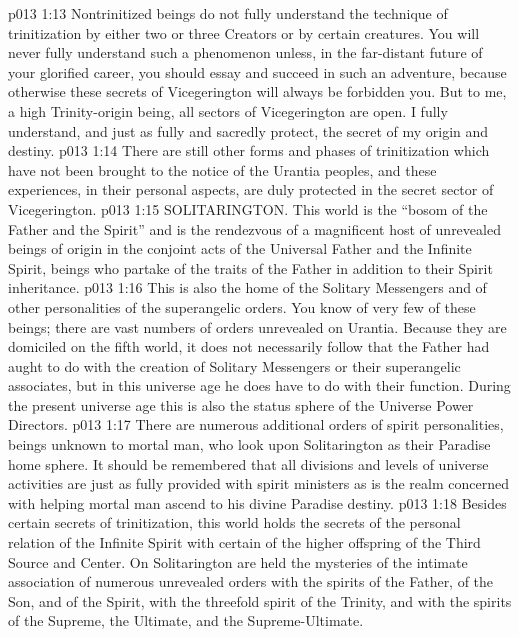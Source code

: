 \vs p013 1:13 Nontrinitized beings do not fully understand the technique of trinitization by either two or three Creators or by certain creatures. You will never fully understand such a phenomenon unless, in the far\hyp{}distant future of your glorified career, you should essay and succeed in such an adventure, because otherwise these secrets of Vicegerington will always be forbidden you. But to me, a high Trinity\hyp{}origin being, all sectors of Vicegerington are open. I fully understand, and just as fully and sacredly protect, the secret of my origin and destiny.\plusone
\vs p013 1:14 There are still other forms and phases of trinitization which have not been brought to the notice of the Urantia peoples, and these experiences, in their personal aspects, are duly protected in the secret sector of Vicegerington.
\pc \vs p013 1:15 \bibnobreakspace SOLITARINGTON. This world is the “bosom of the Father and the Spirit” and is the rendezvous of a magnificent host of unrevealed beings of origin in the conjoint acts of the Universal Father and the Infinite Spirit, beings who partake of the traits of the Father in addition to their Spirit inheritance.
\vs p013 1:16 This is also the home of the Solitary Messengers and of other personalities of the superangelic orders. You know of very few of these beings; there are vast numbers of orders unrevealed on Urantia. Because they are domiciled on the fifth world, it does not necessarily follow that the Father had aught to do with the creation of Solitary Messengers or their superangelic associates, but in this universe age he does have to do with their function. During the present universe age this is also the status sphere of the Universe Power Directors.
\vs p013 1:17 There are numerous additional orders of spirit personalities, beings unknown to mortal man, who look upon Solitarington as their Paradise home sphere. It should be remembered that all divisions and levels of universe activities are just as fully provided with spirit ministers as is the realm concerned with helping mortal man ascend to his divine Paradise destiny.
\pc \vs p013 1:18  Besides certain secrets of trinitization, this world holds the secrets of the personal relation of the Infinite Spirit with certain of the higher offspring of the Third Source and Center. On Solitarington are held the mysteries of the intimate association of numerous unrevealed orders with the spirits of the Father, of the Son, and of the Spirit, with the threefold spirit of the Trinity, and with the spirits of the Supreme, the Ultimate, and the Supreme\hyp{}Ultimate.
